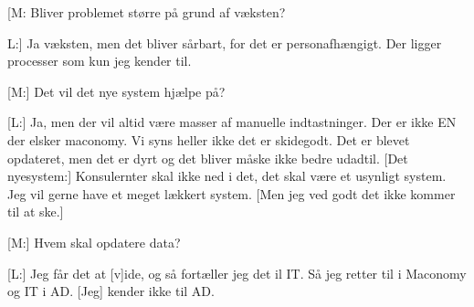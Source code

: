 [M: Bliver problemet større på grund af væksten? 

L:] Ja væksten, men det bliver sårbart, for det er personafhængigt. Der ligger processer som kun jeg kender til.

[M:] Det vil det nye system hjælpe på?

[L:] Ja, men der vil altid være masser af manuelle indtastninger. Der er ikke EN der elsker maconomy. Vi syns heller ikke det er skidegodt. Det er blevet opdateret, men det er dyrt og det bliver måske ikke bedre udadtil.
[Det nyesystem:]
Konsulernter skal ikke ned i det, det skal være et usynligt system. Jeg vil gerne have et meget lækkert system. [Men jeg ved godt det ikke kommer til at ske.]

[M:] Hvem skal opdatere data?

[L:] Jeg får det at [v]ide, og så fortæller jeg det il IT. Så jeg retter til i Maconomy og IT i AD. [Jeg] kender ikke til AD.